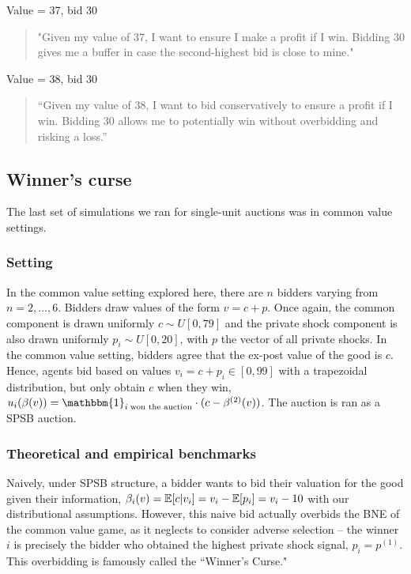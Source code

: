 \documentclass{article} %
\begin{document}
Value = 37, bid 30
\begin{quote}
    "Given my value of 37, I want to ensure I make a profit if I win. Bidding 30 gives me a buffer in case the second-highest bid is close to mine."
\end{quote}

Value = 38, bid 30
\begin{quote}
    “Given my value of 38, I want to bid conservatively to ensure a profit if I win. Bidding 30 allows me to potentially win without overbidding and risking a loss.”
\end{quote}







\subsection{Winner's curse}\label{session:winner}
The last set of simulations we ran for single-unit auctions was in common value settings. 

\subsubsection{Setting}
In the common value setting explored here, there are $n$ bidders varying from $n = 2, ..., 6$. Bidders draw values of the form $v = c + p$. Once again, the common component is drawn uniformly $c \sim U[0, 79]$ and the private shock component is also drawn uniformly $p_i \sim U[0, 20]$, with $p$ the vector of all private shocks. In the common value setting, bidders agree that the ex-post value of the good is $c$. Hence, agents bid based on values $v_i = c + p_i \in [0, 99]$ with a trapezoidal distribution, but only obtain $c$ when they win, $u_i(\beta(v)) = \mathbbm{1}_{i \; \text{won the auction}} \cdot (c - \beta^{(2)}(v))$. The auction is ran as a SPSB auction. 

\subsubsection{Theoretical and empirical benchmarks}
Naively, under SPSB structure, a bidder wants to bid their valuation for the good given their information, $\beta_i(v) = \mathbb{E}[c | v_i] = v_i - \mathbb{E}[p_i] = v_i - 10$ with our distributional assumptions. However, this naive bid actually overbids the BNE of the common value game, as it neglects to consider adverse selection -- the winner $i$ is precisely the bidder who obtained the highest private shock signal, $p_i = p^(1)$. This overbidding is famously called the ``Winner's Curse." 
\end{document}
